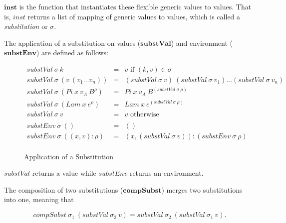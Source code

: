 \documentclass[acmsmall]{acmart}
\begin{document}
$\boldsymbol{inst}$ is the function that instantiates these flexible generic values to values. That is, $inst$ returns a list of mapping of generic values to values, which is called a \emph{substitution} or $\sigma$.

The application of a substitution on values ($\boldsymbol{substVal}$) and environment ($\boldsymbol{substEnv}$) are defined as follows:

\begin{figure}[H]
  \begin{equation*}
    \begin{aligned}
      substVal \: \sigma \: k                            & = & v \textrm{ if } (k,v) \in \sigma                                                           \\
      substVal \: \sigma \: (v \: (v_1 \dots v_n))       & = & (substVal \: \sigma \: v) \: (substVal \: \sigma \: v_1) \dots (substVal \: \sigma \: v_n) \\
      substVal \: \sigma \: (Pi \: x \: v_A \: B^{\rho}) & = & Pi \: x \: v_A \: B^{(substVal \: \sigma \: \rho)}                                         \\
      substVal \: \sigma \: (Lam \: x \: e^{\rho})       & = & Lam \: x \: e^{(substVal \: \sigma \: \rho)}                                               \\
      substVal \: \sigma \: v                            & = & v \textrm{ otherwise}                                                                      \\
      \\
      substEnv \: \sigma \: ()                           & = & ()                                                                                         \\
      substEnv \: \sigma \: ((x,v):\rho)                 & = & (x,(substVal \: \sigma \: v)) : (substEnv \: \sigma \: \rho)                               \\
    \end{aligned}
  \end{equation*}
  \caption{Application of a Substitution}
\end{figure}

$substVal$ returns a value while $substEnv$ returns an environment.

The composition of two substitutions ($\boldsymbol{compSubst}$) merges two substitutions into one, meaning that 

\[
  compSubst \: \sigma_1 \: (substVal \: \sigma_2 \: v) = substVal \: \sigma_2 \: (substVal \: \sigma_1 \: v).
\]
\end{document}
